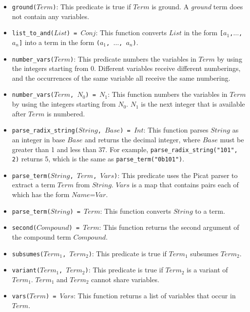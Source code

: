 \begin{itemize}
\item \texttt{ground($Term$)}: This predicate is true if $Term$ is ground.  A \emph{ground} term does not contain any variables.
\item \texttt{list\_to\_and($List$) = $Conj$}: This function converts $List$ in the form \texttt{[$a_1$,$\ldots$,$a_n$]} into a term in the form \texttt{($a_1$, $\ldots$, $a_n$)}.
\item \texttt{number\_vars($Term$)}: This predicate numbers the variables in $Term$ by using the integers starting from 0. Different variables receive different numberings, and the occurrences of the same variable all receive the same numbering.
\item \texttt{number\_vars($Term$, $N_0$) = $N_1$}: This function numbers the variables in $Term$ by using the integers starting from $N_0$.  $N_1$ is the next integer that is available after $Term$ is numbered.  
\item \texttt{parse\_radix\_string($String$, $Base$) = $Int$}: This function 
parses $String$ as an integer in base $Base$ and returns the decimal integer, where $Base$ must be greater than 1 and less than 37. For example, \texttt{parse\_radix\_string("101", 2)} returns 5, which is the same as \texttt{parse\_term("0b101")}.
\item \texttt{parse\_term($String$, $Term$, $Vars$)}: This predicate uses the Picat parser to extract a term $Term$ from $String$. $Vars$ is a map that contains pairs each of which has the form $Name$=$Var$. 
\item \texttt{parse\_term($String$) = $Term$}: This function converts $String$ to a term.
\item \texttt{second($Compound$) = $Term$}: This function returns the second argument of the compound term $Compound$.  
\item \texttt{subsumes($Term_1$, $Term_2$)}: This predicate is true if $Term_1$ subsumes $Term_2$.
\item \texttt{variant($Term_1$, $Term_2$)}: This predicate is true if $Term_2$ is a variant of $Term_1$. $Term_1$ and $Term_2$ cannot share variables.
\item \texttt{vars($Term$) = $Vars$}: This function returns a list of variables that occur in $Term$.
\end{itemize}
\ignore{

}
